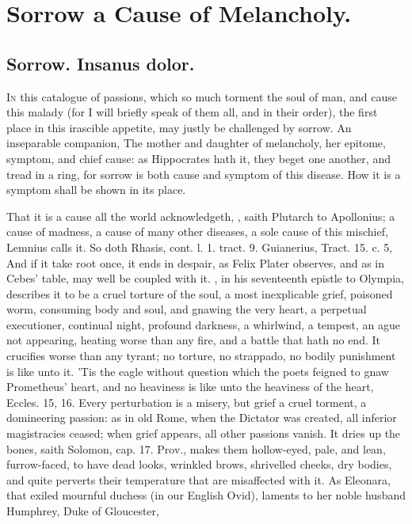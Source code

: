 {{%
\section{Sorrow a Cause of Melancholy.}

\subsection{Sorrow. \textlatin{Insanus dolor.}}
\lettrine{I}{n} this catalogue of passions, which so much torment the soul of man, and cause
this malady (for I will briefly speak of them all, and in their order), the
first place in this irascible appetite, may justly be challenged by sorrow. An
inseparable companion, The mother and daughter of melancholy,
her epitome, symptom, and chief cause: as Hippocrates hath it, they beget one
another, and tread in a ring, for sorrow is both cause and symptom of this
disease. How it is a symptom shall be shown in its place.

That it is a cause all the world acknowledgeth, , saith Plutarch to Apollonius; a
cause of madness, a cause of many other diseases, a sole cause of this
mischief, Lemnius calls it. So doth Rhasis, cont. l. 1. tract. 9.
Guianerius, Tract. 15. c. 5, And if it take root once, it ends in
despair, as Felix Plater observes, and as in Cebes' table,
may well be coupled with it. \Chrysostom{}, in his seventeenth
epistle to Olympia, describes it to be a cruel torture of the soul, a
most inexplicable grief, poisoned worm, consuming body and soul, and
gnawing the very heart, a perpetual executioner, continual night,
profound darkness, a whirlwind, a tempest, an ague not appearing,
heating worse than any fire, and a battle that hath no end. It
crucifies worse than any tyrant; no torture, no strappado, no bodily
punishment is like unto it. 'Tis the eagle without question which the
poets feigned to gnaw Prometheus' heart, and no heaviness is like
unto the heaviness of the heart, Eccles.  15, 16. Every
perturbation is a misery, but grief a cruel torment, a domineering
passion: as in old Rome, when the Dictator was created, all inferior
magistracies ceased; when grief appears, all other passions vanish. It
dries up the bones, saith Solomon, cap. 17. Prov., makes them
hollow-eyed, pale, and lean, furrow-faced, to have dead looks, wrinkled
brows, shrivelled cheeks, dry bodies, and quite perverts their
temperature that are misaffected with it. As Eleonara, that exiled
mournful duchess (in our English Ovid), laments to her noble
husband Humphrey, Duke of Gloucester,

}}
